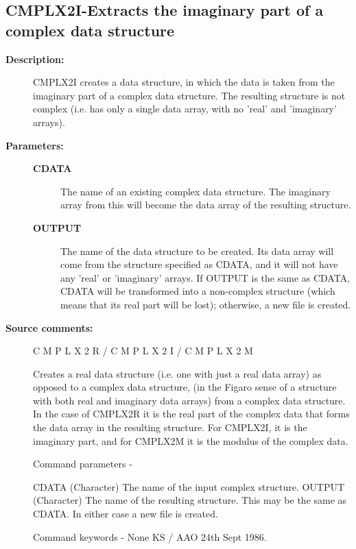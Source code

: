 \subsection{CMPLX2I-\label{CMPLX2I}Extracts the imaginary part of a complex data structure}
\begin{description}

\item [\textbf{Description:}]
 CMPLX2I creates a data structure, in which the data is taken
 from the imaginary part of a complex data structure.  The
 resulting structure is not complex (i.e. has only a single data
 array, with no 'real' and 'imaginary' arrays).

\item [\textbf{Parameters:}]
\begin{description}
\item [\textbf{CDATA}]
 The name of an existing complex data structure.
 The imaginary array from this will become the data array
 of the resulting structure.
\item [\textbf{OUTPUT}]
 The name of the data structure to be created.
 Its data array will come from the structure specified as
 CDATA, and it will not have any 'real' or 'imaginary'
 arrays.  If OUTPUT is the same as CDATA, CDATA will be
 transformed into a non-complex structure (which means
 that its real part will be lost); otherwise, a new file
 is created.
\end{description}

\item [\textbf{Source comments:}]
\begin{terminalv}
 C M P L X 2 R    /     C M P L X 2 I   /   C M P L X 2 M

 Creates a real data structure (i.e. one with just a real data array)
 as opposed to a complex data structure, (in the Figaro sense of a
 structure with both  real and imaginary data arrays)
 from a complex data structure.
 In the case of CMPLX2R it is the real part of the complex data
 that forms the data array in the resulting structure.
 For CMPLX2I, it is the imaginary part, and for CMPLX2M
 it is the modulus of the complex data.

 Command parameters -

 CDATA    (Character) The name of the input complex structure.
 OUTPUT   (Character) The name of the resulting structure.  This
          may be the same as CDATA. In either case a new file
          is created.

 Command keywords - None
                                     KS / AAO  24th Sept 1986.
\end{terminalv}
\end{description}
